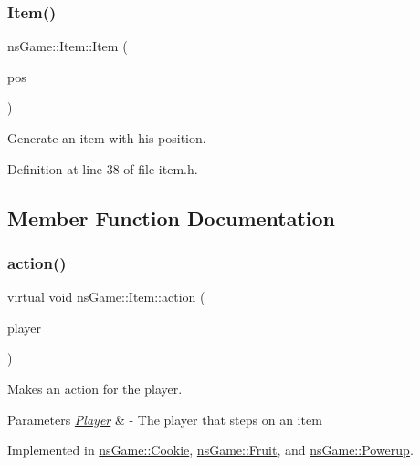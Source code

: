 \subsubsection{\texorpdfstring{Item()}{Item()}}
{\footnotesize\ttfamily ns\+Game\+::\+Item\+::\+Item (\begin{DoxyParamCaption}\item[{ns\+Graphics\+::\+Vec2D}]{pos }\end{DoxyParamCaption})\hspace{0.3cm}{\ttfamily [inline]}}



Generate an item with his position. 



Definition at line 38 of file item.\+h.



\subsection{Member Function Documentation}
\mbox{\label{structns_game_1_1_item_af74dffcf9bde4a4297749f4e1852395b}} 
\subsubsection{\texorpdfstring{action()}{action()}}
{\footnotesize\ttfamily virtual void ns\+Game\+::\+Item\+::action (\begin{DoxyParamCaption}\item[{\hyperlink{classns_game_1_1_player}{Player} $\ast$}]{player }\end{DoxyParamCaption})\hspace{0.3cm}{\ttfamily [pure virtual]}}



Makes an action for the player. 


\begin{DoxyParams}{Parameters}
{\em \hyperlink{classns_game_1_1_player}{Player}} & -\/ The player that steps on an item \\
\hline
\end{DoxyParams}


Implemented in \hyperlink{classns_game_1_1_cookie_a2cd4ee8c83b99191643d6e9ef2267b1a}{ns\+Game\+::\+Cookie}, \hyperlink{classns_game_1_1_fruit_ad33836a67756dba7390b95c57898e91c}{ns\+Game\+::\+Fruit}, and \hyperlink{classns_game_1_1_powerup_af307aba7b61132f2dc037d8ef62581f9}{ns\+Game\+::\+Powerup}.

